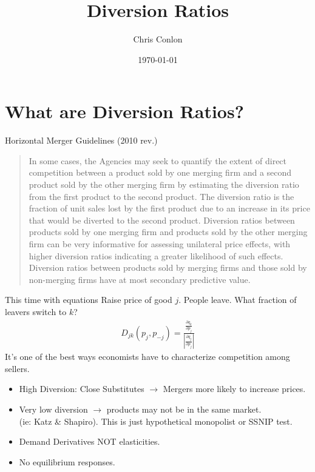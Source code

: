 \documentclass[xcolor=pdftex,dvipsnames,table,mathserif,aspectratio=169]{beamer}
\begin{document}
\title{Diversion Ratios}
\author{Chris Conlon}
\date{\today}

\frame{\titlepage}
\section{What are Diversion Ratios?} 

\begin{frame}{Horizontal Merger Guidelines (2010 rev.)}
\begin{quote}
In some cases, the Agencies may seek to quantify the extent of direct competition between a product sold by one merging firm and a second product sold by the other merging firm by estimating the diversion ratio from the first product to the second product. The diversion ratio is the \alert{fraction of unit sales lost by the first product due to an increase in its price that would be diverted to the second product}. Diversion ratios between products sold by one merging firm and products sold by the other merging firm can be very informative for assessing unilateral price effects, with \alert{higher diversion ratios indicating a greater likelihood of such effects}. Diversion ratios between products sold by merging firms and those sold by \alert{non-merging firms have at most secondary predictive value.}
\end{quote}
\end{frame}

\begin{frame}{This time with equations}
 Raise price of good $j$. People leave. What fraction of leavers switch to $k$?
\begin{eqnarray*}
D_{jk} (p_j,p_{-j})= \frac{\frac{\partial q_k}{\partial p_j}}{\left|\frac{\partial q_j}{\partial p_j} \right|}
\end{eqnarray*}
It's one of the best ways economists have to characterize competition among sellers.
\begin{itemize}
\item High Diversion: Close Substitutes $\rightarrow$ Mergers more likely to increase prices.
\item Very low diversion $\rightarrow$ products may not be in the same market.\\ (ie: Katz \& Shapiro). This is just hypothetical monopolist or SSNIP test.
\item Demand Derivatives NOT elasticities.
\item No equilibrium responses.
\end{itemize}
\end{frame}
\end{document}
